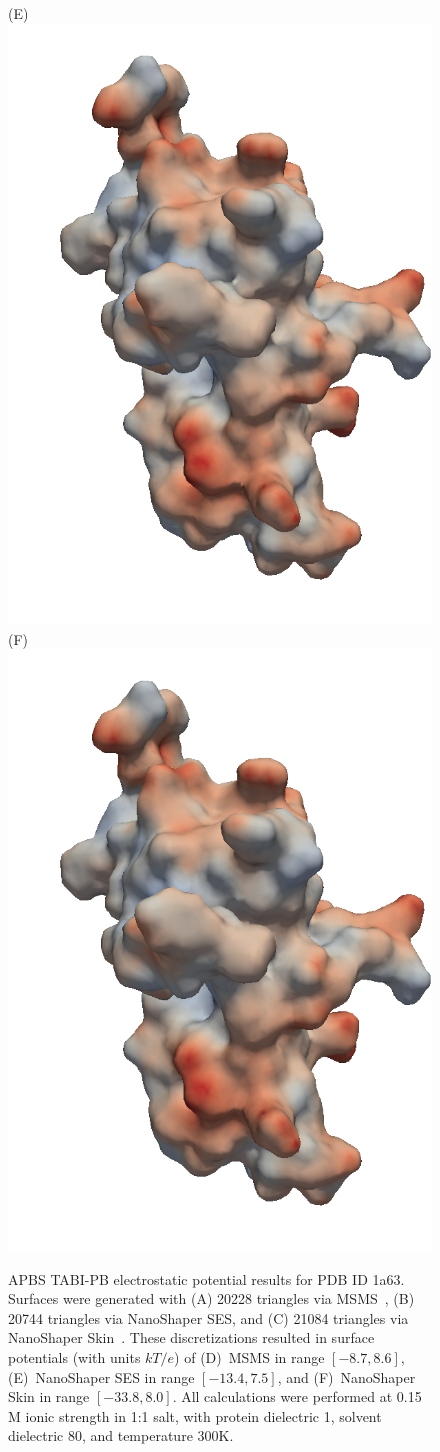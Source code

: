 \documentclass[12pt,titlepage]{article}
\begin{document}
\begin{figure}
	\hspace{-10pt}
	(E)~\hspace{-3pt}\includegraphics[angle=0,width=0.25\linewidth]{NSSES}
	\hspace{-10pt} 
	(F)~\hspace{-3pt}\includegraphics[angle=0,width=0.25\linewidth]{NSSkin}
	\hspace{-5pt}
	\caption{APBS TABI-PB electrostatic potential results for PDB ID 1a63.
		Surfaces were generated with (A) 20228 triangles via MSMS~\cite{Sanner1995}, (B) 20744 triangles via NanoShaper SES, and (C) 21084 triangles via NanoShaper Skin~\cite{Decherchi2013}.
		These discretizations resulted in surface potentials (with units $kT/e$) of (D)~MSMS in range $[-8.7, 8.6]$, (E)~NanoShaper SES in range $[-13.4, 7.5]$, and (F)~NanoShaper Skin in range $[-33.8, 8.0]$.
		All calculations were performed at 0.15 M ionic strength in 1:1 salt, with protein dielectric 1, solvent dielectric 80, and temperature 300K.
		\label{fig:surface-potential}
		\label{fig:surface-mesher}}
\end{figure}
\end{document}
